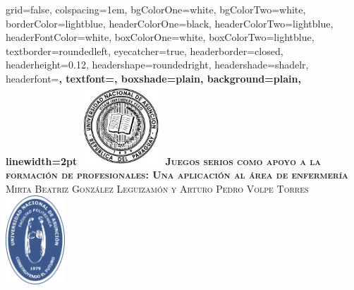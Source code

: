 \documentclass[portrait,final,a0paper,fontscale=0.277]{baposter}
\begin{document}
\begin{poster}%
  {
  grid=false,
  colspacing=1em,
  bgColorOne=white,
  bgColorTwo=white,
  borderColor=lightblue,
  headerColorOne=black,
  headerColorTwo=lightblue,
  headerFontColor=white,
  boxColorOne=white,
  boxColorTwo=lightblue,
  textborder=roundedleft,
  eyecatcher=true,
  headerborder=closed,
  headerheight=0.12\textheight,
  headershape=roundedright,
  headershade=shadelr,
  headerfont=\Large\bf\textsc, %
  textfont={\setlength{\parindent}{1.5em}},
  boxshade=plain,
  background=plain,
  linewidth=2pt
  }
  {\includegraphics[height=8em]{imagenes/una.png}} 
  {\bf\textsc{Juegos serios como apoyo a la formación de
          profesionales:\hspace{5cm} Una aplicación al área de enfermería}\vspace{0.5em}}
  {\textsc{Mirta Beatriz González Leguizamón y Arturo Pedro Volpe Torres}}
  {%
    \includegraphics[height=9em]{../util/logo.pdf}
  }

    \newcommand{\colouredcircle}{%
      \tikz{\useasboundingbox (-0.2em,-0.32em) rectangle(0.2em,0.32em);
          \draw[draw=black,fill=lightblue,line width=0.03em] (0,0) circle(0.18em);}\-\ }


\end{poster}
\end{document}

